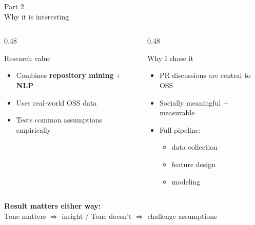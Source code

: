 \documentclass[aspectratio=169,11pt]{beamer}
\begin{document}
\begin{frame}{Part 2\\Why it is interesting}

\begin{columns}

\begin{column}{0.48\textwidth}
\begin{exampleblock}{Research value}
\begin{itemize}
  \item Combines \textbf{repository mining} + \textbf{NLP}
  \item Uses real-world OSS data
  \item Tests common assumptions empirically
\end{itemize}
\end{exampleblock}
\end{column}

\begin{column}{0.48\textwidth}
\begin{block}{Why I chose it}
\begin{itemize}
  \item PR discussions are central to OSS
  \item Socially meaningful + measurable
  \item Full pipeline:
  \begin{itemize}
    \item data collection
    \item feature design
    \item modeling
  \end{itemize}
\end{itemize}
\end{block}
\end{column}

\end{columns}

\vspace{0.5em}
\centering
\textbf{Result matters either way:}\\
Tone matters $\Rightarrow$ insight \quad / \quad
Tone doesn't $\Rightarrow$ challenge assumptions

\end{frame}
\end{document}
